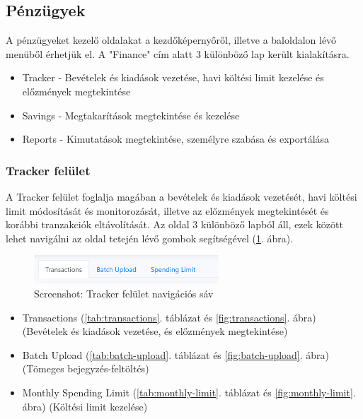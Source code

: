 \subsection{Pénzügyek}
A pénzügyeket kezelő oldalakat a kezdőképernyőről, illetve a baloldalon lévő menüből érhetjük el. A "Finance" cím alatt 3 különböző lap került kialakításra.
\begin{itemize}
	\item Tracker - Bevételek és kiadások vezetése, havi költési limit kezelése és előzmények megtekintése
	\item Savings - Megtakarítások megtekintése és kezelése
	\item Reports - Kimutatások megtekintése, személyre szabása és exportálása
\end{itemize}

\subsubsection{Tracker felület}
A Tracker felület foglalja magában a bevételek és kiadások vezetését, havi költési limit módosítását és monitorozását, illetve az előzmények megtekintését és korábbi tranzakciók eltávolítását. Az oldal 3 különböző lapból áll, ezek között lehet navigálni az oldal tetején lévő gombok segítségével (\ref{fig:tracker-tabs}. ábra).
\begin{figure}[H]
	\centering
	\includegraphics[height=40px]{img/tracker-tabs}
	\caption{Screenshot: Tracker felület navigációs sáv}
	\label{fig:tracker-tabs}
\end{figure}
\begin{itemize}
	\item Transactions (\ref{tab:transactions}. táblázat és \ref{fig:transactions}. ábra) (Bevételek és kiadások vezetése, és előzmények megtekintése)
	\item Batch Upload (\ref{tab:batch-upload}. táblázat és \ref{fig:batch-upload}. ábra) (Tömeges bejegyzés-feltöltés)
	\item Monthly Spending Limit (\ref{tab:monthly-limit}. táblázat és \ref{fig:monthly-limit}. ábra) (Költési limit kezelése) 
\end{itemize}

